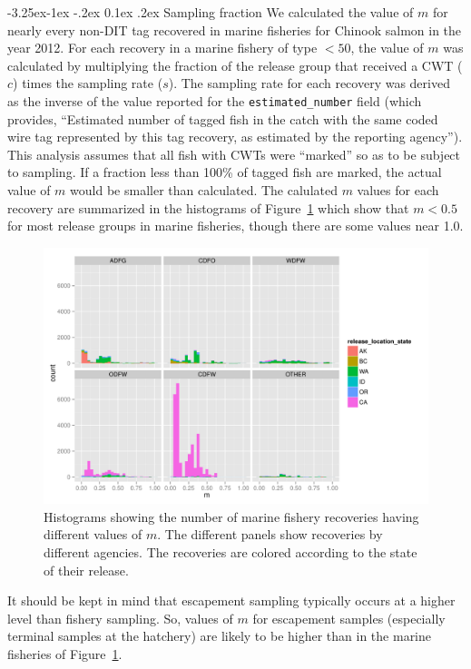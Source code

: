 \documentclass[11pt]{article}
\makeatletter
\renewcommand\subsection{\@startsection{subsection}{2}{\z@}%
                                     {-3.25ex\@plus -1ex \@minus -.2ex}%
                                     {0.1ex \@plus .2ex}%
                                     {\normalfont\normalsize\bfseries}}
\makeatother
\begin{document}
\subsection{Sampling fraction}
We calculated the value of $m$ for nearly every non-DIT tag recovered in marine fisheries
for Chinook salmon in the year 2012.  For each recovery in a marine fishery of type $<50$, 
the value of $m$ was calculated by multiplying the fraction of the release group that received a CWT ($c$) 
times the sampling rate ($s$). The sampling rate for each recovery was derived as the inverse of the value
reported for the {\tt estimated\_number} field
(which provides, ``Estimated number of tagged fish in the catch with the same coded wire
tag represented by this tag recovery, as estimated by the reporting agency'').
This analysis assumes that all fish with CWTs were ``marked'' so 
as to be subject to sampling.  If a fraction less than 100\% of tagged fish are marked, the actual value of $m$
would be smaller than calculated.  The calulated $m$ values for each recovery are summarized in the 
histograms of Figure~\ref{fig:mhists} which show that $m < 0.5$ for most release groups
in marine fisheries, though there are some values near 1.0.
\begin{figure}
\centering
\includegraphics[width = \textwidth]{./images/m_histo_chinook.pdf}
\caption{Histograms showing the number of marine fishery recoveries having different values of $m$.  The different
panels show recoveries by different agencies.  The recoveries are colored according to the 
state of their release.}
\label{fig:mhists}
\end{figure}
It should be kept in mind that escapement sampling typically occurs at a higher level than fishery sampling. So,
values of $m$ for escapement samples (especially terminal samples at the hatchery) are likely to be higher than
in the marine fisheries of Figure~\ref{fig:mhists}.
  
\end{document}
